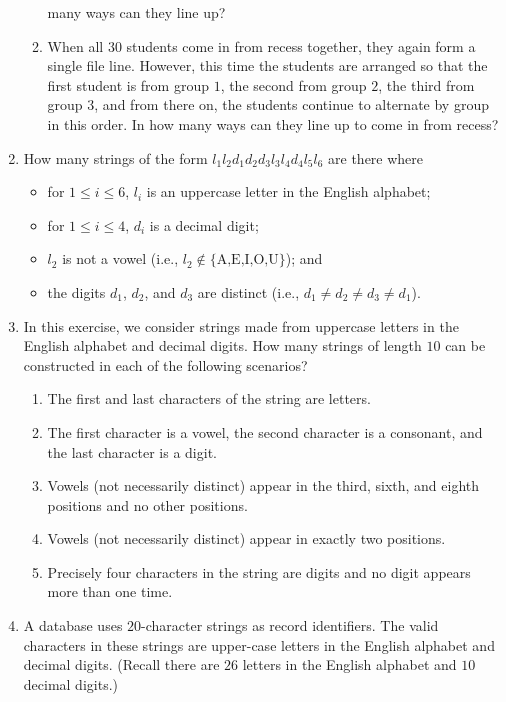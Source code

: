 \begin{enumerate}
\begin{enumerate}
      many ways can they line up?
    \item When all $30$ students come in from recess together, they
      again form a single file line. However, this time the students
      are arranged so that the first student is from group $1$, the
      second from group $2$, the third from group $3$, and from there
      on, the students continue to alternate by group in this
      order. In how many ways can they line up to come in from recess?
    \end{enumerate}
  \item How many strings of the form $l_1l_2d_1d_2d_3l_3l_4d_4l_5l_6$
    are there where
    \begin{itemize}
    \item for $1\leq i\leq 6$, $l_i$ is an uppercase letter in the
      English alphabet;
    \item for $1\leq i\leq 4$, $d_i$ is a decimal digit;
    \item $l_2$ is not a vowel (i.e., $l_2\nin\{\text{A,E,I,O,U}\}$); and
    \item the digits $d_1$, $d_2$, and $d_3$ are distinct (i.e.,
      $d_1\neq d_2\neq d_3\neq d_1$).
    \end{itemize}
  \item In this exercise, we consider strings made from uppercase
    letters in the English alphabet and decimal digits. How many
    strings of length $10$ can be constructed in each of the following
    scenarios?
    \begin{enumerate}
    \item The first and last characters of the string are letters.
    \item The first character is a vowel, the second character is a
      consonant, and the last character is a digit.
    \item Vowels (not necessarily distinct) appear in the third,
      sixth, and eighth positions and no other positions.
    \item Vowels (not necessarily distinct) appear in exactly two
      positions.
    \item Precisely four characters in the string are digits and no
      digit appears more than one time.
    \end{enumerate}
  \item A database uses $20$-character strings as record
    identifiers. The valid characters in these strings are upper-case
    letters in the English alphabet and decimal digits. (Recall there
    are $26$ letters in the English alphabet and $10$ decimal digits.)

\end{enumerate}
